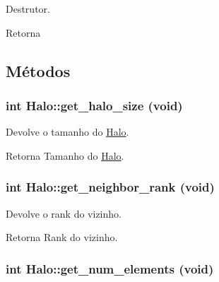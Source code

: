 Destrutor. 

\begin{DoxyReturn}{Retorna}

\end{DoxyReturn}


\subsection{Métodos}
\hypertarget{classHalo_ae19759b97579ff67e8503cb46a69d786}{
\subsubsection[{get\_\-halo\_\-size}]{\setlength{\rightskip}{0pt plus 5cm}int Halo::get\_\-halo\_\-size (void)}}
\label{classHalo_ae19759b97579ff67e8503cb46a69d786}


Devolve o tamanho do \hyperlink{classHalo}{Halo}. 

\begin{DoxyReturn}{Retorna}
Tamanho do \hyperlink{classHalo}{Halo}. 
\end{DoxyReturn}
\hypertarget{classHalo_a9582022dcf67b5ae988b322fa528e782}{
\subsubsection[{get\_\-neighbor\_\-rank}]{\setlength{\rightskip}{0pt plus 5cm}int Halo::get\_\-neighbor\_\-rank (void)}}
\label{classHalo_a9582022dcf67b5ae988b322fa528e782}


Devolve o rank do vizinho. 

\begin{DoxyReturn}{Retorna}
Rank do vizinho. 
\end{DoxyReturn}
\hypertarget{classHalo_a8e4ee7b51272939a0ffeae9dc7f364d8}{
\subsubsection[{get\_\-num\_\-elements}]{\setlength{\rightskip}{0pt plus 5cm}int Halo::get\_\-num\_\-elements (void)}}
\label{classHalo_a8e4ee7b51272939a0ffeae9dc7f364d8}


